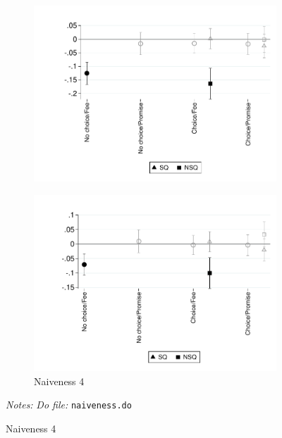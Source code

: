 \documentclass[11pt]{article}
\begin{document}
\begin{figure}[H]
\begin{center}
\begin{subfigure}{0.45\textwidth}
        \centering
        \includegraphics[width=\textwidth]{Figuras/te_graph_pos_pay_default.pdf}
    \end{subfigure}
    \begin{subfigure}{0.45\textwidth}
        \caption{Naiveness 4}
        \centering
        \includegraphics[width=\textwidth]{Figuras/te_graph_pay_30_default.pdf}
    \end{subfigure}
    \end{center}
     \footnotesize \textit{Notes: } 
      \footnotesize{ \textit{Do file: }  \texttt{naiveness.do}}
\end{figure}
\end{document}
